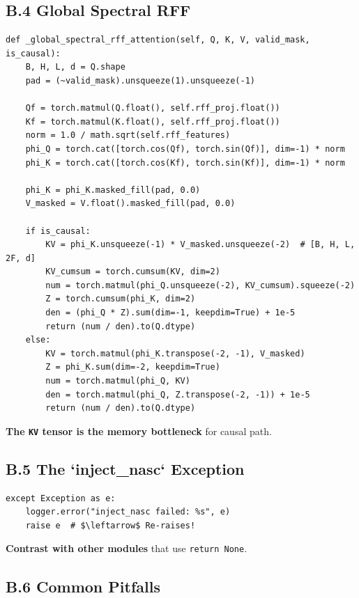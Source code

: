 \subsection{B.4 Global Spectral RFF}

\begin{lstlisting}
def _global_spectral_rff_attention(self, Q, K, V, valid_mask, is_causal):
    B, H, L, d = Q.shape
    pad = (~valid_mask).unsqueeze(1).unsqueeze(-1)
    
    Qf = torch.matmul(Q.float(), self.rff_proj.float())
    Kf = torch.matmul(K.float(), self.rff_proj.float())
    norm = 1.0 / math.sqrt(self.rff_features)
    phi_Q = torch.cat([torch.cos(Qf), torch.sin(Qf)], dim=-1) * norm
    phi_K = torch.cat([torch.cos(Kf), torch.sin(Kf)], dim=-1) * norm
    
    phi_K = phi_K.masked_fill(pad, 0.0)
    V_masked = V.float().masked_fill(pad, 0.0)
    
    if is_causal:
        KV = phi_K.unsqueeze(-1) * V_masked.unsqueeze(-2)  # [B, H, L, 2F, d]
        KV_cumsum = torch.cumsum(KV, dim=2)
        num = torch.matmul(phi_Q.unsqueeze(-2), KV_cumsum).squeeze(-2)
        Z = torch.cumsum(phi_K, dim=2)
        den = (phi_Q * Z).sum(dim=-1, keepdim=True) + 1e-5
        return (num / den).to(Q.dtype)
    else:
        KV = torch.matmul(phi_K.transpose(-2, -1), V_masked)
        Z = phi_K.sum(dim=-2, keepdim=True)
        num = torch.matmul(phi_Q, KV)
        den = torch.matmul(phi_Q, Z.transpose(-2, -1)) + 1e-5
        return (num / den).to(Q.dtype)
\end{lstlisting}

\textbf{The \texttt{KV} tensor is the memory bottleneck} for causal path.

\subsection{B.5 The `inject\_nasc` Exception}

\begin{lstlisting}
except Exception as e:
    logger.error("inject_nasc failed: %s", e)
    raise e  # $\leftarrow$ Re-raises!
\end{lstlisting}

\textbf{Contrast with other modules} that use \texttt{return None}.

\subsection{B.6 Common Pitfalls}

